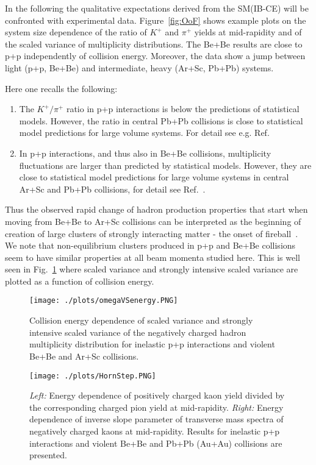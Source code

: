 \documentclass{PoS}
\begin{document}
In the following the qualitative expectations derived from the SM(IB-CE) will be confronted with experimental data.
Figure~\ref{fig:OoF} shows example plots on the system size dependence of the ratio
of $K^+$ and $\pi^+$ yields at mid-rapidity and of the scaled variance of multiplicity distributions. 
The Be+Be results are  close to p+p independently of collision energy. 
Moreover, the data show a jump between light (p+p, Be+Be) and intermediate, heavy (Ar+Sc, Pb+Pb) 
systems.
 
Here one recalls the following:
\begin{enumerate}
	\item
	The $K^+/\pi^+$ ratio in p+p interactions is below the 
	predictions of statistical models. However, the ratio in central Pb+Pb collisions is  
	close to statistical model predictions for large volume systems. 
	For detail see e.g. Ref.~\cite{Becattini:2005xt} 
	\item
	In p+p interactions, and thus also in Be+Be collisions, multiplicity fluctuations are larger than predicted by statistical models.
	However, they are close to statistical model predictions for large volume systems in central Ar+Sc and Pb+Pb collisions,
	for detail see Ref.~\cite{Begun:2006uu}.
\end{enumerate}
Thus the observed rapid change of hadron production properties that start when moving from Be+Be 
to Ar+Sc collisions can be interpreted as the beginning of creation of large clusters of 
strongly interacting matter - the onset of fireball~\cite{sr2017}. 
We note that non-equilibrium clusters produced in p+p and Be+Be collisions seem to have similar properties
at all beam momenta studied here.
This is well seen in Fig.~\ref{fig:omegaVSenergy} where scaled variance and strongly intensive scaled variance are plotted
as a function of collision energy. 


\begin{figure}[h]
	\centering
	\texttt{[image: ./plots/omegaVSenergy.PNG]}
	\caption[]
	{
		Collision energy dependence of scaled variance and strongly intensive scaled variance of the negatively charged hadron multiplicity distribution for inelastic p+p interactions and violent Be+Be and
		Ar+Sc collisions.
	}
	\label{fig:omegaVSenergy}
\end{figure}

\begin{figure}[h]
\centering
\texttt{[image: ./plots/HornStep.PNG]}
\caption[]
{
\textit{Left:} Energy dependence of positively charged kaon yield divided by the corresponding charged pion yield at mid-rapidity.
\textit{Right:} Energy dependence of inverse slope parameter of transverse mass spectra of negatively charged kaons at mid-rapidity.
Results for inelastic p+p interactions and violent Be+Be and Pb+Pb (Au+Au) collisions are presented.	
}
\label{fig:HornStep}
\end{figure}
\end{document}
